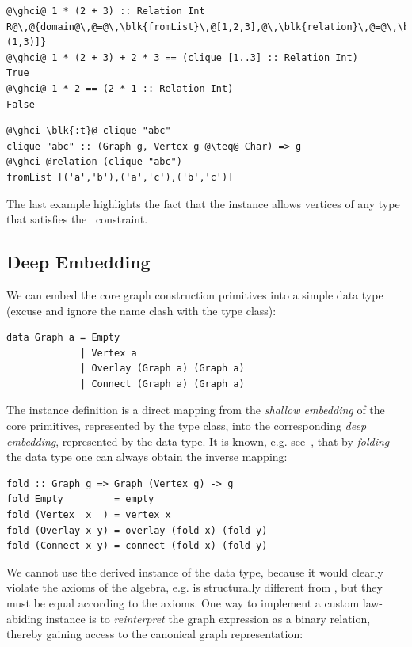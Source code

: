 \vspace{1mm}
\begin{verbatim}
@\ghci@ 1 * (2 + 3) :: Relation Int
R@\,@{domain@\,@=@\,\blk{fromList}\,@[1,2,3],@\,\blk{relation}\,@=@\,\blk{fromList}\,@[(1,2),(1,3)]}
@\ghci@ 1 * (2 + 3) + 2 * 3 == (clique [1..3] :: Relation Int)
True
@\ghci@ 1 * 2 == (2 * 1 :: Relation Int)
False
\end{verbatim}
\begin{verbatim}
@\ghci \blk{:t}@ clique "abc"
clique "abc" :: (Graph g, Vertex g @\teq@ Char) => g
@\ghci @relation (clique "abc")
fromList [('a','b'),('a','c'),('b','c')]
\end{verbatim}

\noindent
The last example highlights the fact that the  instance allows vertices
of any type  that satisfies the~ constraint.

\subsection{Deep Embedding}\label{sub-embedding}

We can embed the core graph construction primitives into a simple data type
(excuse and ignore the name clash with the type class):

\begin{verbatim}
data Graph a = Empty
             | Vertex a
             | Overlay (Graph a) (Graph a)
             | Connect (Graph a) (Graph a)
\end{verbatim}

The instance definition is a direct mapping from the \emph{shallow embedding}
of the core primitives, represented by the type class, into the
corresponding \emph{deep embedding}, represented by the data type.
It is known, e.g. see~\citet{2014_gibbons_folding}, that by \emph{folding} the data
type one can always obtain the inverse mapping:

\begin{verbatim}
fold :: Graph g => Graph (Vertex g) -> g
fold Empty         = empty
fold (Vertex  x  ) = vertex x
fold (Overlay x y) = overlay (fold x) (fold y)
fold (Connect x y) = connect (fold x) (fold y)
\end{verbatim}

We cannot use the derived  instance of the  data type, because it
would clearly violate the axioms of the algebra, e.g.  is
structurally different from , but they must be equal according to the axioms.
One way to implement a custom law-abiding  instance is to \emph{reinterpret}
the graph expression as a binary relation, thereby gaining access to the canonical
graph representation:


